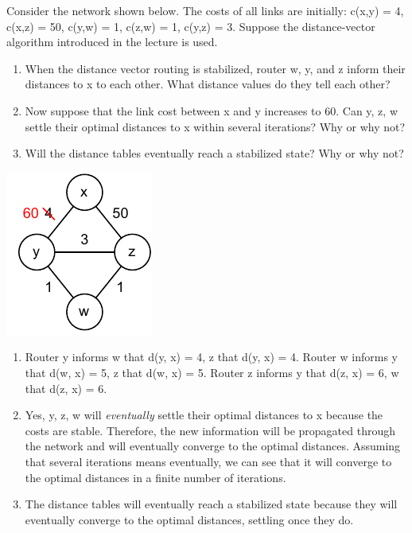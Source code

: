 \documentclass{report}
\begin{document}
\newpage
\begin{problem}
Consider the network shown below. The costs of all links are initially: c(x,y) = 4, c(x,z) = 50, c(y,w) = 1, c(z,w) = 1, c(y,z) = 3. Suppose the distance-vector algorithm introduced in the lecture is used.
\begin{enumerate}
    \item When the distance vector routing is stabilized, router w, y, and z inform their distances to x to each other. What distance values do they tell each other?
    \item Now suppose that the link cost between x and y increases to 60. Can y, z, w settle their optimal distances to x within several iterations? Why or why not?
    \item Will the distance tables eventually reach a stabilized state? Why or why not?
\end{enumerate}
\begin{center}
\includegraphics[width=.2\columnwidth]{figures/count-to-infinity.pdf}
\end{center}

\medskip
\begin{answer}{30em}
    \begin{enumerate}
        \item Router y informs w that d(y, x) = 4, z that d(y, x) = 4.
            \newline
            Router w informs y that d(w, x) = 5, z that d(w, x) = 5.
            \newline
            Router z informs y that d(z, x) = 6, w that d(z, x) = 6.
        \item Yes, y, z, w will \textit{eventually} settle their optimal distances to x because the costs are stable.
            Therefore, the new information will be propagated through the network and will eventually
            converge to the optimal distances. Assuming that several iterations means eventually, we can
            see that it will converge to the optimal distances in a finite number of iterations.
        \item The distance tables will eventually reach a stabilized state because they will eventually
            converge to the optimal distances, settling once they do.
    \end{enumerate}
\end{answer}
\end{problem}
\end{document}
